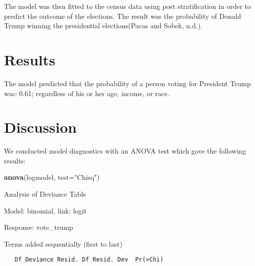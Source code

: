 \documentclass[
  12pt,
]{article}
\newenvironment{Shaded}{\begin{snugshade}}{\end{snugshade}}
\newcommand{\DataTypeTok}[1]{\textcolor[rgb]{0.13,0.29,0.53}{#1}}
\newcommand{\KeywordTok}[1]{\textcolor[rgb]{0.13,0.29,0.53}{\textbf{#1}}}
\newcommand{\NormalTok}[1]{#1}
\newcommand{\OperatorTok}[1]{\textcolor[rgb]{0.81,0.36,0.00}{\textbf{#1}}}
\newcommand{\StringTok}[1]{\textcolor[rgb]{0.31,0.60,0.02}{#1}}
\begin{document}
The model was then fitted to the census data using post stratification
in order to predict the outcome of the elections. The result was the
probability of Donald Trump winning the presidential elections(Pacas and
Sobek, n.d.).

\begin{Shaded}
\end{Shaded}

\hypertarget{results}{%
\section{Results}\label{results}}

The model predicted that the probability of a person voting for
President Trump was: 0.61; regardless of his or her age, income, or
race.

\hypertarget{discussion}{%
\section{Discussion}\label{discussion}}

We conducted model diagnostics with an ANOVA test which gave the
following results:

\begin{Shaded}
\begin{Highlighting}[]
\KeywordTok{anova}\NormalTok{(logmodel, }\DataTypeTok{test=}\StringTok{"Chisq"}\NormalTok{)}
\end{Highlighting}
\end{Shaded}

Analysis of Deviance Table

Model: binomial, link: logit

Response: vote\_trump

Terms added sequentially (first to last)

\begin{verbatim}
   Df Deviance Resid. Df Resid. Dev  Pr(>Chi)    
\end{verbatim}
\end{document}
